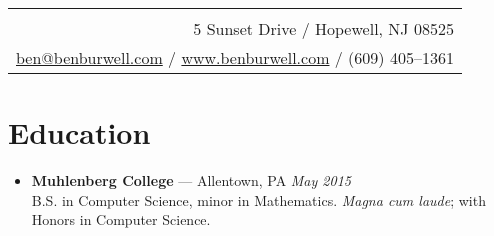 \documentclass[11pt]{article}
\begin{document}
\thispagestyle{empty}

\noindent\begin{tabularx}{\textwidth}{|N|}
   \\
  5 Sunset Drive / Hopewell, NJ 08525 \\
  \href{mailto:ben@benburwell.com}{ben@benburwell.com} / \href{https://www.benburwell.com/}{www.benburwell.com} / (609) 405--1361 \\
  \hline
\end{tabularx}



\section*{Education}
\begin{itemize}
  \item \textbf{Muhlenberg College} --- Allentown, PA \hfill {\em May 2015} \\
    B.S. in Computer Science, minor in Mathematics. {\em Magna cum laude}; with Honors in Computer Science.
\end{itemize}
\end{document}
